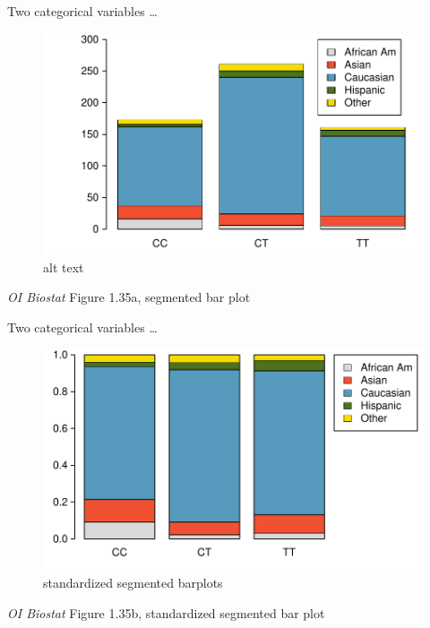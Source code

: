 \documentclass[
  ignorenonframetext,
]{beamer}
\begin{document}
\begin{frame}{Two categorical variables \dots}
\protect\hypertarget{two-categorical-variables-2}{}

\begin{figure}
\centering
\includegraphics{figures/famussSegBarA.pdf}
\caption{alt text}
\end{figure}

\emph{OI Biostat} Figure 1.35a, segmented bar plot

\end{frame}

\begin{frame}{Two categorical variables \dots}
\protect\hypertarget{two-categorical-variables-3}{}

\begin{figure}
\centering
\includegraphics{figures/famussSegBarStaA.pdf}
\caption{standardized segmented barplots}
\end{figure}

\emph{OI Biostat} Figure 1.35b, standardized segmented bar plot

\end{frame}
\end{document}
